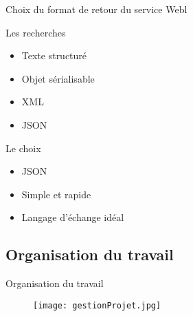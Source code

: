 
\begin{frame}{Choix du format de retour du service Webl}
	\begin{block}{Les recherches}
		\begin{itemize}
			\item Texte structur\'e
			\item Objet s\'erialisable
			\item XML
			\item JSON
		
		\end{itemize}

	\end{block}
	
	\begin{block}{Le choix}
		\begin{itemize}
			\item JSON
			\item Simple et rapide
			\item Langage d'\'echange id\'eal
		
		\end{itemize}

	\end{block}

\end{frame}



\subsection{Organisation du travail}

\begin{frame}{Organisation du travail}
	\begin{figure}[h]
		\centering
		\texttt{[image: gestionProjet.jpg]}

	\end{figure}

\end{frame}














